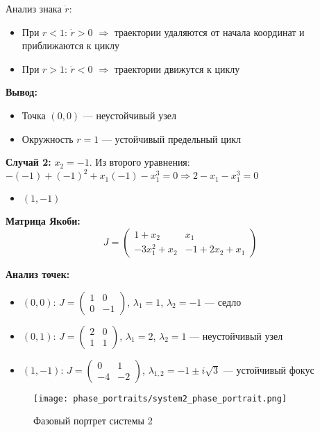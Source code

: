 Анализ знака $\dot{r}$:
\begin{itemize}
\item При $r < 1$: $\dot{r} > 0$ $\Rightarrow$ траектории удаляются от начала координат и приближаются к циклу
\item При $r > 1$: $\dot{r} < 0$ $\Rightarrow$ траектории движутся к циклу
\end{itemize}

\textbf{Вывод:}
\begin{itemize}
\item Точка $(0,0)$ --- неустойчивый узел
\item Окружность $r = 1$ --- устойчивый предельный цикл
\end{itemize}

\textbf{Случай 2:} $x_2 = -1$. Из второго уравнения: $-(-1) + (-1)^2 + x_1(-1) - x_1^3 = 0 \Rightarrow 2 - x_1 - x_1^3 = 0$

\begin{itemize}
\item $(1, -1)$
\end{itemize}

\textbf{Матрица Якоби:}
$$J = \begin{pmatrix} 1 + x_2 & x_1 \\ -3x_1^2 + x_2 & -1 + 2x_2 + x_1 \end{pmatrix}$$

\textbf{Анализ точек:}
\begin{itemize}
\item $(0, 0)$: $J = \begin{pmatrix} 1 & 0 \\ 0 & -1 \end{pmatrix}$, $\lambda_1 = 1$, $\lambda_2 = -1$ --- седло
\item $(0, 1)$: $J = \begin{pmatrix} 2 & 0 \\ 1 & 1 \end{pmatrix}$, $\lambda_1 = 2$, $\lambda_2 = 1$ --- неустойчивый узел
\item $(1, -1)$: $J = \begin{pmatrix} 0 & 1 \\ -4 & -2 \end{pmatrix}$, $\lambda_{1,2} = -1 \pm i\sqrt{3}$ --- устойчивый фокус
\end{itemize}

\begin{figure}[H]
\centering
\texttt{[image: phase\_portraits/system2\_phase\_portrait.png]}
\caption{Фазовый портрет системы 2}
\label{fig:system2_phase_portrait}
\end{figure}

